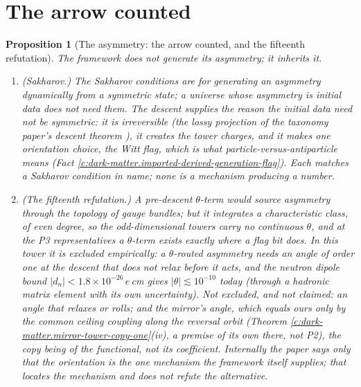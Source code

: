 \documentclass[11pt]{article}
\newtheorem{proposition}[theorem]{Proposition}
\theoremstyle{definition}
\theoremstyle{plain}
\newcommand{\changedmark}[2]{\marginpar{\raggedright\scriptsize\color{#1}#2}}
\begin{document}
\section{The arrow counted}

\begin{proposition}[The asymmetry: the arrow counted, and the fifteenth refutation]\label{c:dark-matter.asymmetry-arrow-counted-fifteenth-refutation}
\changedmark{BurntOrange}{changed since the deposit}
The framework does not generate its asymmetry; it inherits it.
\begin{enumerate}
\item[(i)] \emph{(Sakharov.)} The Sakharov conditions are for generating an asymmetry dynamically from a symmetric state; a universe whose asymmetry is initial data does not need them. The descent supplies the reason the initial data need not be symmetric: it is irreversible (the lossy projection of the taxonomy paper's descent theorem \cite{ButlerT1}), it creates the tower charges, and it makes one orientation choice, the Witt flag, which is what particle-versus-antiparticle means (Fact \ref{c:dark-matter.imported-derived-generation-flag}). Each matches a Sakharov condition in name; none is a mechanism producing a number.
\item[(ii)] \emph{(The fifteenth refutation.)} A pre-descent $\theta$-term would source asymmetry through the topology of gauge bundles; but it integrates a characteristic class, of even degree, so the odd-dimensional towers carry no continuous $\theta$, and at the P3 representatives a $\theta$-term exists exactly where a flag bit does. In this tower it is excluded empirically: a $\theta$-routed asymmetry needs an angle of order one at the descent that does not relax before it acts, and the neutron dipole bound $|d_{n}| < 1.8 \times 10^{-26}\,e\,$cm \cite{Abel2020} gives $|\theta| \lesssim 10^{-10}$ today (through a hadronic matrix element with its own uncertainty). Not excluded, and not claimed: an angle that relaxes or rolls; and the mirror's angle, which equals ours only by the common ceiling coupling along the reversal orbit (Theorem \ref{c:dark-matter.mirror-tower-copy-one}(iv), a premise of its own there, not P2), the copy being of the functional, not its coefficient. Internally the paper says only that the orientation is the one mechanism the framework itself supplies; that locates the mechanism and does not refute the alternative.

\end{enumerate}
\end{proposition}
\end{document}
